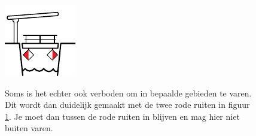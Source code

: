 \begin{figure}[H]
\centering
\begin{minipage}[b]{0.18\textwidth}
	\includegraphics[width=\textwidth]{Hoofdstukken/Bruggen/pdf/brug_verboden_gebied.pdf}
	\caption{}
	\label{pic:brug:gebied_verbod}
\end{minipage}
\hfill
\begin{minipage}[t]{0.75\textwidth}
	\vspace{-2.5cm}
	Soms is het echter ook verboden om in bepaalde gebieden te varen. Dit wordt dan duidelijk gemaakt met de twee rode ruiten in figuur \ref{pic:brug:gebied_verbod}. Je moet dan tussen de rode ruiten in blijven en mag hier niet buiten varen.
\end{minipage}
\end{figure}

